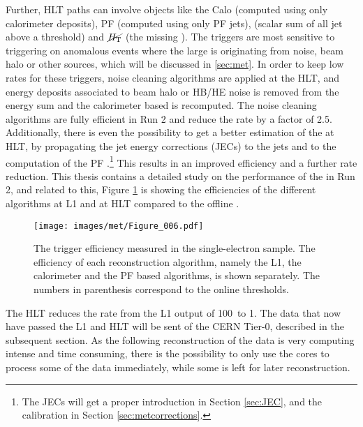 Further, HLT paths can involve objects like the Calo \ptmiss (computed using only calorimeter deposits), PF \ptmiss (computed using only PF jets), \HT (scalar sum of all jet \pt above a threshold) and $\cancel{H_{\mathrm{T}}}$ (the missing \HT). 
The \ptmiss triggers are most sensitive to triggering on anomalous events where the large \ptmiss is originating from noise, beam halo or other sources, which will be discussed in \ref{sec:met}. 
In order to keep low rates for these triggers, noise cleaning algorithms are applied at the HLT, and energy deposits associated to beam halo or HB/HE noise is removed from the energy sum and the calorimeter based \ptmiss is recomputed. 
The noise cleaning algorithms are fully efficient in Run 2 and reduce the rate by a factor of 2.5. 
Additionally, there is even the possibility to get a better estimation of the \ptmiss at HLT, by propagating the jet energy corrections (JECs) to the jets and to the computation of the PF \ptmiss.\footnote{The JECs will get a proper introduction in Section \ref{sec:JEC}, and the \ptmiss calibration in Section \ref{sec:metcorrections}.} 
This results in an improved efficiency and a further rate reduction. 
This thesis contains a detailed study on the performance of the \ptmiss in Run 2, and related to this, Figure \ref{fig:triggerMET} is showing the efficiencies of the different \ptmiss algorithms at L1 and at HLT compared to the offline \ptmiss.   
\begin{figure}[!htp]
  \centering
   \texttt{[image: images/met/Figure\_006.pdf]}
   \caption{The \ptmiss trigger efficiency measured in the single-electron sample. The efficiency of each reconstruction algorithm, namely the L1, the calorimeter and the PF based \ptmiss algorithms, is shown separately. The numbers in parenthesis correspond to the online \ptmiss thresholds.}
   \label{fig:triggerMET}
\end{figure}                                                                         
The HLT reduces the rate from the L1 output of 100\kHz\ to 1\kHz. 
The data that now have passed the L1 and HLT will be sent of the CERN Tier-0, described in the subsequent section. 
As the following reconstruction of the data is very computing intense and time consuming, there is the possibility to only use the cores to process some of the data immediately, while some is left for later reconstruction. 
